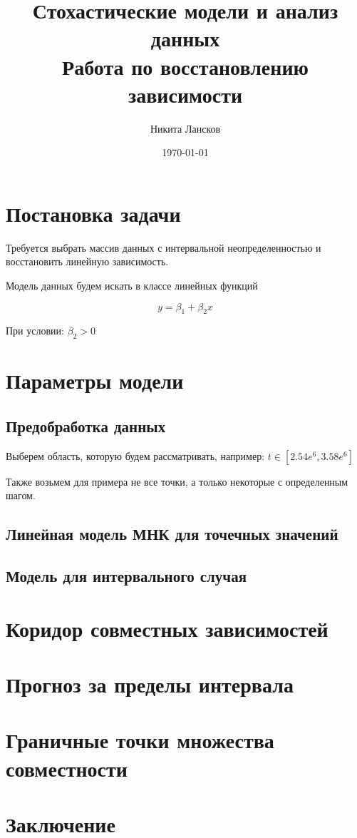 \documentclass[a4paper,12pt]{article}
\date{\today}
\author{Никита Лансков}
\title{Стохастические модели и анализ данных\\
Работа по восстановлению зависимости}
\begin{document}

\maketitle
\tableofcontents

\newpage

\section{Постановка задачи}
Требуется выбрать массив данных с интервальной неопределенностью и восстановить
линейную зависимость.

Модель данных будем искать в классе линейных функций

\begin{equation}
    y = \beta_1 + \beta_2x
\end{equation}

При условии: $\beta_2 > 0$


\section{Параметры модели}

\subsection{Предобработка данных}
Выберем область, которую будем рассматривать, например: 
$t \in [2.54e^6, 3.58e^6]$


Также возьмем для примера не все точки, а только некоторые с определенным 
шагом.



\subsection{Линейная модель МНК для точечных значений}

\subsection{Модель для интервального случая}

\newpage
\section{Коридор совместных зависимостей}
\newpage
\section{Прогноз за пределы интервала}
\newpage
\section{Граничные точки множества совместности}
\newpage
\section{Заключение}
\newpage

\listoffigures
\listoftables


\end{document}

